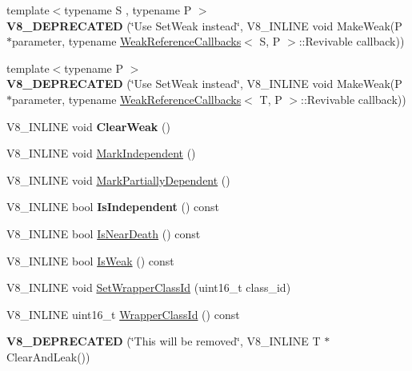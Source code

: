 \begin{DoxyCompactItemize}
\item 
\hypertarget{classv8_1_1_persistent_ab6bd795d0257c5bd44500a9c616a6679}{}{\footnotesize template$<$typename S , typename P $>$ }\\{\bfseries V8\+\_\+\+D\+E\+P\+R\+E\+C\+A\+T\+E\+D} (\char`\"{}Use Set\+Weak instead\char`\"{}, V8\+\_\+\+I\+N\+L\+I\+N\+E void Make\+Weak(P $\ast$parameter, typename \hyperlink{classv8_1_1_weak_reference_callbacks}{Weak\+Reference\+Callbacks}$<$ S, P $>$\+::Revivable callback))\label{classv8_1_1_persistent_ab6bd795d0257c5bd44500a9c616a6679}

\item 
\hypertarget{classv8_1_1_persistent_a468f93b10323db8e2b379e016f1c14dc}{}{\footnotesize template$<$typename P $>$ }\\{\bfseries V8\+\_\+\+D\+E\+P\+R\+E\+C\+A\+T\+E\+D} (\char`\"{}Use Set\+Weak instead\char`\"{}, V8\+\_\+\+I\+N\+L\+I\+N\+E void Make\+Weak(P $\ast$parameter, typename \hyperlink{classv8_1_1_weak_reference_callbacks}{Weak\+Reference\+Callbacks}$<$ T, P $>$\+::Revivable callback))\label{classv8_1_1_persistent_a468f93b10323db8e2b379e016f1c14dc}

\item 
\hypertarget{classv8_1_1_persistent_af1a1228291c5272f224b41080b5a2e45}{}V8\+\_\+\+I\+N\+L\+I\+N\+E void {\bfseries Clear\+Weak} ()\label{classv8_1_1_persistent_af1a1228291c5272f224b41080b5a2e45}

\item 
V8\+\_\+\+I\+N\+L\+I\+N\+E void \hyperlink{classv8_1_1_persistent_ad2d7495af17c3ae917f1fbb8c36c9f86}{Mark\+Independent} ()
\item 
V8\+\_\+\+I\+N\+L\+I\+N\+E void \hyperlink{classv8_1_1_persistent_a94fd3d423f3e437e9d880e6f7271f7f1}{Mark\+Partially\+Dependent} ()
\item 
\hypertarget{classv8_1_1_persistent_a4789d71037fe5c69dc282e7f3f4e5ac7}{}V8\+\_\+\+I\+N\+L\+I\+N\+E bool {\bfseries Is\+Independent} () const \label{classv8_1_1_persistent_a4789d71037fe5c69dc282e7f3f4e5ac7}

\item 
V8\+\_\+\+I\+N\+L\+I\+N\+E bool \hyperlink{classv8_1_1_persistent_ae4fe9f57506755db8c4e1e1babafce71}{Is\+Near\+Death} () const 
\item 
V8\+\_\+\+I\+N\+L\+I\+N\+E bool \hyperlink{classv8_1_1_persistent_a088127d75c3c6405f76e8208c9b22204}{Is\+Weak} () const 
\item 
V8\+\_\+\+I\+N\+L\+I\+N\+E void \hyperlink{classv8_1_1_persistent_ae13a65ef19dd410fd8eb1ef970139149}{Set\+Wrapper\+Class\+Id} (uint16\+\_\+t class\+\_\+id)
\item 
V8\+\_\+\+I\+N\+L\+I\+N\+E uint16\+\_\+t \hyperlink{classv8_1_1_persistent_ac5d361fcc04f2f02e30f116e3c3a9699}{Wrapper\+Class\+Id} () const 
\item 
\hypertarget{classv8_1_1_persistent_a71d71df553603c5a96d5e5a7eb37ee6a}{}{\bfseries V8\+\_\+\+D\+E\+P\+R\+E\+C\+A\+T\+E\+D} (\char`\"{}This will be removed\char`\"{}, V8\+\_\+\+I\+N\+L\+I\+N\+E T $\ast$Clear\+And\+Leak())\label{classv8_1_1_persistent_a71d71df553603c5a96d5e5a7eb37ee6a}


\end{DoxyCompactItemize}
